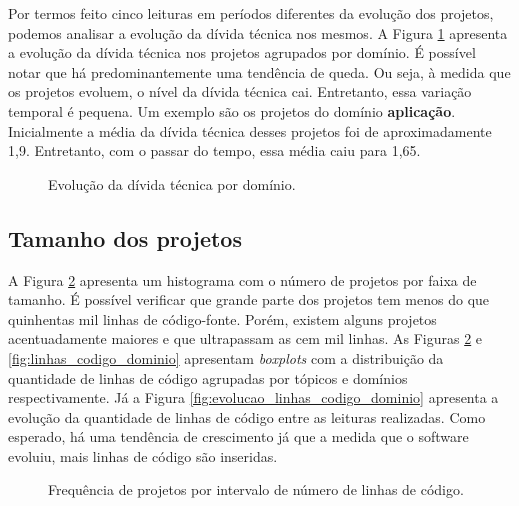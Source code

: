 Por termos feito cinco leituras em períodos diferentes da evolução dos projetos, podemos analisar a evolução da dívida técnica nos mesmos. A Figura \ref{fig:evolucao_por_dominio} apresenta a evolução da dívida técnica nos projetos agrupados por domínio. É possível notar que há predominantemente uma tendência de queda. Ou seja, à medida que os projetos evoluem, o nível da dívida técnica cai. Entretanto, essa variação temporal é pequena.  Um exemplo são os projetos do domínio \textbf{aplicação}. Inicialmente a média da dívida técnica desses projetos foi de aproximadamente 1,9. Entretanto, com o passar do tempo, essa média caiu para 1,65. 



 \begin{figure}[H]
  \centering
  \caption{Evolução da dívida técnica por domínio.}
  \label{fig:evolucao_por_dominio} 
\end{figure}



\subsection{Tamanho dos projetos}

A Figura \ref{fig:histograma_nloc} apresenta um histograma com o número de projetos por faixa de tamanho. É possível verificar que grande parte dos projetos tem menos do que quinhentas mil linhas de código-fonte. Porém, existem alguns projetos acentuadamente maiores e que ultrapassam as cem mil linhas. As Figuras \ref{fig:histograma_nloc} e \ref{fig:linhas_codigo_dominio} apresentam \textit{boxplots} com a distribuição da quantidade de linhas de código agrupadas por tópicos e domínios respectivamente. Já a Figura \ref{fig:evolucao_linhas_codigo_dominio} apresenta a evolução da quantidade de linhas de código entre as leituras realizadas. Como esperado, há uma tendência de crescimento já que a medida que o software evoluiu, mais linhas de código são inseridas. 


 \begin{figure}[H]
  \centering
  \caption{Frequência de projetos por intervalo de número de linhas de código.}
  \label{fig:histograma_nloc} 
\end{figure}



